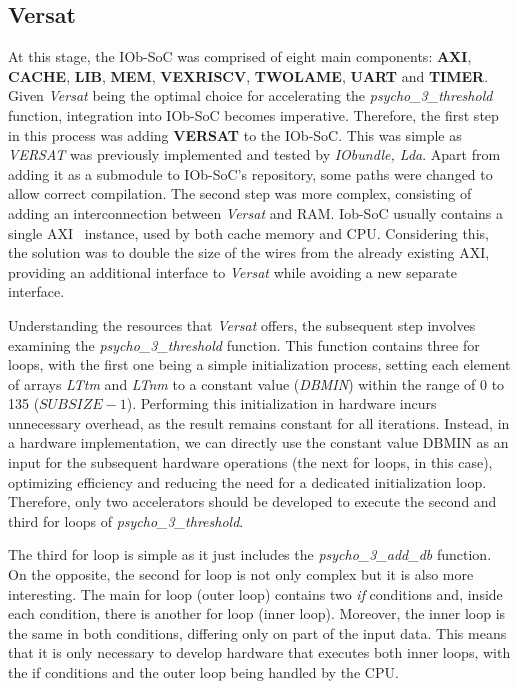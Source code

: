 \subsection{Versat}
At this stage, the IOb-SoC was comprised of eight main components: \textbf{AXI}, \textbf{CACHE}, \textbf{LIB}, \textbf{MEM}, \textbf{VEXRISCV}, \textbf{TWOLAME}, \textbf{UART} and \textbf{TIMER}. Given \textit{Versat} being the optimal choice for accelerating the \textit{psycho\_3\_threshold} function, integration into IOb-SoC becomes imperative.
Therefore, the first step in this process was adding \textbf{VERSAT} to the IOb-SoC. This was simple as \textit{VERSAT} was previously implemented and tested by \textit{IObundle, Lda}. Apart from adding it as a submodule to IOb-SoC's repository, some paths were changed to allow correct compilation.
The second step was more complex, consisting of adding an interconnection between \textit{Versat} and RAM. Iob-SoC usually contains a single AXI~\cite{bib:axi_xilinx} instance, used by both cache memory and CPU. Considering this, the solution was to double the size of the wires from the already existing AXI, providing an additional interface to \textit{Versat} while avoiding a new separate interface.

Understanding the resources that \textit{Versat} offers, the subsequent step involves examining the \textit{psycho\_3\_threshold} function.
This function contains three for loops, with the first one being a simple initialization process, setting each element of arrays \textit{LTtm} and \textit{LTnm} to a constant value (\textit{DBMIN}) within the range of 0 to 135 ($SUBSIZE-1$). Performing this initialization in hardware incurs unnecessary overhead, as the result remains constant for all iterations. Instead, in a hardware implementation, we can directly use the constant value DBMIN as an input for the subsequent hardware operations (the next for loops, in this case), optimizing efficiency and reducing the need for a dedicated initialization loop.
Therefore, only two accelerators should be developed to execute the second and third for loops of \textit{psycho\_3\_threshold}.

The third for loop is simple as it just includes the \textit{psycho\_3\_add\_db} function. 
On the opposite, the second for loop is not only complex but it is also more interesting. The main for loop (outer loop) contains two \textit{if} conditions and, inside each condition, there is another for loop (inner loop). Moreover, the inner loop is the same in both conditions, differing only on part of the input data. This means that it is only necessary to develop hardware that executes both inner loops, with the if conditions and the outer loop being handled by the CPU.

